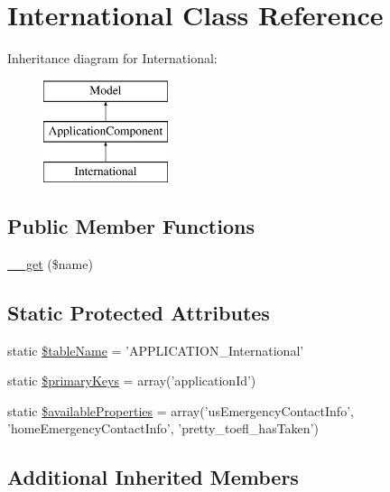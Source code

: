 \hypertarget{class_international}{\section{International Class Reference}
\label{class_international}
}
Inheritance diagram for International\-:\begin{figure}[H]
\begin{center}
\leavevmode
\includegraphics[height=3.000000cm]{class_international}
\end{center}
\end{figure}
\subsection*{Public Member Functions}
\begin{DoxyCompactItemize}
\item 
\hyperlink{class_international_a54dba2163003ccc423d7c7d8e5a46b5f}{\-\_\-\-\_\-get} (\$name)
\end{DoxyCompactItemize}
\subsection*{Static Protected Attributes}
\begin{DoxyCompactItemize}
\item 
static \hyperlink{class_international_a69eca92f1e9c8bf2f4f4581a69ef8e63}{\$table\-Name} = 'A\-P\-P\-L\-I\-C\-A\-T\-I\-O\-N\-\_\-\-International'
\item 
static \hyperlink{class_international_a03be3dc0c9e584bdc5909dfbe6c78d40}{\$primary\-Keys} = array('application\-Id')
\item 
static \hyperlink{class_international_a2bc8ae3ac3a5be839625f7f53eca9b7a}{\$available\-Properties} = array('us\-Emergency\-Contact\-Info', 'home\-Emergency\-Contact\-Info', 'pretty\-\_\-toefl\-\_\-has\-Taken')
\end{DoxyCompactItemize}
\subsection*{Additional Inherited Members}


